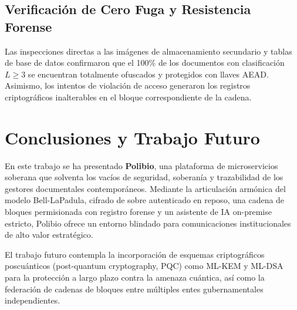 \documentclass[journal,10pt]{IEEEtran}
\begin{document}
\begin{table}[htbp]
\caption{Rendimiento de Operaciones Criptográficas en Polibio}
\begin{center}
\end{center}
\end{table}

\subsection{Verificación de Cero Fuga y Resistencia Forense}
Las inspecciones directas a las imágenes de almacenamiento secundario y tablas de base de datos confirmaron que el 100\% de los documentos con clasificación $L \ge 3$ se encuentran totalmente ofuscados y protegidos con llaves AEAD. Asimismo, los intentos de violación de acceso generaron los registros criptográficos inalterables en el bloque correspondiente de la cadena.

\section{Conclusiones y Trabajo Futuro}
En este trabajo se ha presentado \textbf{Polibio}, una plataforma de microservicios soberana que solventa los vacíos de seguridad, soberanía y trazabilidad de los gestores documentales contemporáneos. Mediante la articulación armónica del modelo Bell-LaPadula, cifrado de sobre autenticado en reposo, una cadena de bloques permisionada con registro forense y un asistente de IA on-premise estricto, Polibio ofrece un entorno blindado para comunicaciones institucionales de alto valor estratégico.

El trabajo futuro contempla la incorporación de esquemas criptográficos poscuánticos (post-quantum cryptography, PQC) como ML-KEM y ML-DSA para la protección a largo plazo contra la amenaza cuántica, así como la federación de cadenas de bloques entre múltiples entes gubernamentales independientes.



\end{document}
